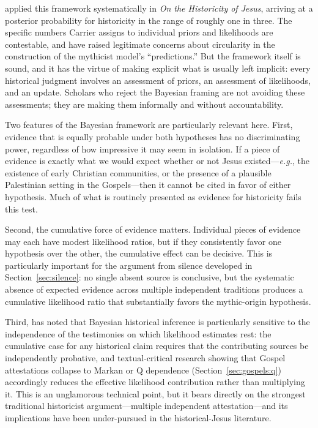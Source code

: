 \documentclass[12pt,oneside]{article}
\newcommand{\eg}{\textit{e.g.}}
\begin{document}
\citet{Carrier2014} applied this framework systematically in \textit{On
the Historicity of Jesus}, arriving at a posterior probability for
historicity in the range of roughly one in three.  The specific numbers
Carrier assigns to individual priors and likelihoods are contestable,
and \citet{Vridar2014} have raised legitimate concerns about circularity
in the construction of the mythicist model's ``predictions.''  But the
framework itself is sound, and it has the virtue of making explicit what
is usually left implicit: every historical judgment involves an
assessment of priors, an assessment of likelihoods, and an update.
Scholars who reject the Bayesian framing are not avoiding these
assessments; they are making them informally and without accountability.

Two features of the Bayesian framework are particularly relevant here.
First, evidence that is equally probable under both hypotheses has no
discriminating power, regardless of how impressive it may seem in
isolation.  If a piece of evidence is exactly what we would expect
whether or not Jesus existed---\eg, the existence of early Christian
communities, or the presence of a plausible Palestinian setting in the
Gospels---then it cannot be cited in favor of either hypothesis.  Much
of what is routinely presented as evidence for historicity fails this
test.

Second, the cumulative force of evidence matters.  Individual pieces of
evidence may each have modest likelihood ratios, but if they
consistently favor one hypothesis over the other, the cumulative effect
can be decisive.  This is particularly important for the argument from
silence developed in Section~\ref{sec:silence}: no single absent source
is conclusive, but the systematic absence of expected evidence across
multiple independent traditions produces a cumulative likelihood ratio
that substantially favors the mythic-origin hypothesis.

Third, \citet{Tucker2004} has noted that Bayesian historical inference
is particularly sensitive to the independence of the testimonies on
which likelihood estimates rest: the cumulative case for any historical
claim requires that the contributing sources be independently probative,
and textual-critical research showing that Gospel attestations collapse
to Markan or Q dependence (Section~\ref{sec:gospels:q}) accordingly
reduces the effective likelihood contribution rather than multiplying
it.  This is an unglamorous technical point, but it bears directly on
the strongest traditional historicist argument---multiple independent
attestation---and its implications have been under-pursued in the
historical-Jesus literature.
\end{document}
